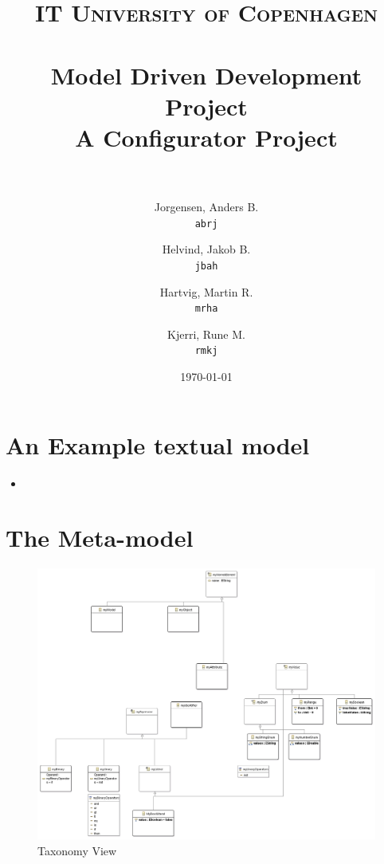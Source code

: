 \documentclass[paper=a4, fontsize=11pt]{scrartcl} %
\title{	
\normalfont \normalsize 
\textsc{IT University of Copenhagen} \\ [25pt] %
\horrule{0.5pt} \\[0.4cm] %
\huge Model Driven Development Project \\ %
\large A Configurator Project \\ %
\horrule{2pt} \\[0.5cm] %
}
\author{
  Jorgensen, Anders B.\\
  \texttt{abrj}
  \and
  Helvind, Jakob B.\\
  \texttt{jbah}
  \and
  Hartvig, Martin R.\\
  \texttt{mrha}
  \and
  Kjerri, Rune M.\\
  \texttt{rmkj}
}
\date{\normalsize\today} %
\numberwithin{equation}{section} %
\numberwithin{figure}{section} %
\numberwithin{table}{section} %
\newcommand{\java}[2]{
\begin{itemize}
\item[]
\end{itemize}
}
\begin{document}
\maketitle %
\newpage


\section{An Example textual model}
\java{../configproject/runtime-CarFactory/src/factory.smdpdsl}{Concrete syntax of a CarFactory}

\section{The Meta-model}
\begin{figure}[H]
\centering
\includegraphics[scale=0.6]{pictures/taxView.png}
\caption{Taxonomy View}
\end{figure}
\end{document}
